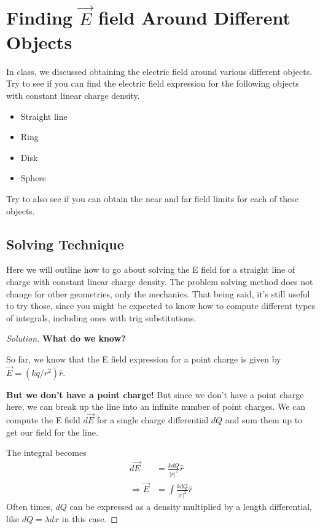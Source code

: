 \documentclass[12pt]{extreport}
\newenvironment{solution}
  {\renewcommand\qedsymbol{$\blacksquare$}\begin{proof}[Solution]}
  {\end{proof}}
\begin{document}
\section{Finding $\vec E$ field Around Different Objects}
In class, we discussed obtaining the electric field around various different objects. Try to see if you can find the electric field expression for the following objects with constant linear charge density.
	\begin{itemize}
		\item Straight line
		\item Ring
		\item Disk
		\item Sphere
	\end{itemize}
Try to also see if you can obtain the near and far field limits for each of these objects. 

\subsection{Solving Technique}
Here we will outline how to go about solving the E field for a straight line of charge with constant linear charge density. The problem solving method does not change for other geometries, only the mechanics. That being said, it's still useful to try those, since you might be expected to know how to compute different types of integrals, including ones with trig substitutions. 

\begin{solution}

	\textbf{What do we know?}

	So far, we know that the E field expression for a point charge is given by $\vec E = (kq/r^2) \hat r.$ 

	\textbf{But we don't have a point charge!}
	But since we don't have a point charge here, we can break up the line into an infinite number of point charges. We can compute the E field $d\vec E$ for a single charge differential $dQ$ and sum them up to get our field for the line.

	The integral becomes 
	\begin{align*}
		d\vec E &= \frac{k dQ}{|r|^2} \hat r \\
		\Rightarrow \vec E &= \int \frac{k dQ}{|r|^2} \hat r
	\end{align*}
	Often times, $dQ$ can be expressed as a density multiplied by a length differential, like $dQ = \lambda dx$ in this case.
\end{solution}
\end{document}
